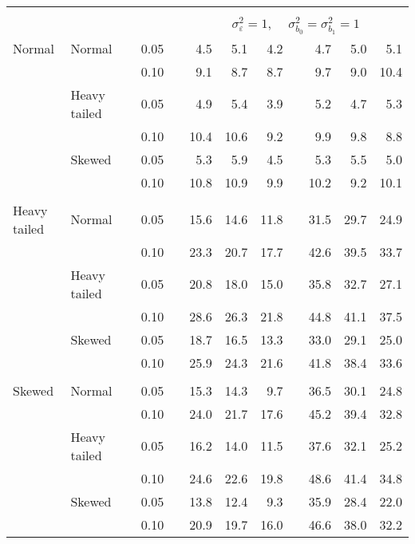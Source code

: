 \begin{table}[ht]
\begin{scriptsize}
\begin{tabular}{ll p{.1cm} c p{.1cm} rrr p{.1cm} rrr}
&&&&&&&&&&&\\
& && && \multicolumn{7}{c}{$\sigma_{\varepsilon}^2 = 1$, \ \ $\sigma_{b_0}^2 = \sigma_{b_1}^2 = 1$} \\ \cline{6-12}
\rowcolor{gray!20} Normal & Normal &  & 0.05 &  & 4.5 & 5.1 & 4.2 &  & 4.7 & 5.0 & 5.1 \\ 
\rowcolor{gray!20}    &  &  & 0.10 &  & 9.1 & 8.7 & 8.7 &  & 9.7 & 9.0 & 10.4 \\ 
\rowcolor{gray!20}    & Heavy tailed &  & 0.05 &  & 4.9 & 5.4 & 3.9 &  & 5.2 & 4.7 & 5.3 \\ 
\rowcolor{gray!20}    &  &  & 0.10 &  & 10.4 & 10.6 & 9.2 &  & 9.9 & 9.8 & 8.8 \\ 
\rowcolor{gray!20}    & Skewed &  & 0.05 &  & 5.3 & 5.9 & 4.5 &  & 5.3 & 5.5 & 5.0 \\ 
\rowcolor{gray!20}    &  &  & 0.10 &  & 10.8 & 10.9 & 9.9 &  & 10.2 & 9.2 & 10.1 \\ 
&&&&&&&&&&&\\
  Heavy tailed & Normal &  & 0.05 &  & 15.6 & 14.6 & 11.8 &  & 31.5 & 29.7 & 24.9 \\ 
   &  &  & 0.10 &  & 23.3 & 20.7 & 17.7 &  & 42.6 & 39.5 & 33.7 \\ 
   & Heavy tailed &  & 0.05 &  & 20.8 & 18.0 & 15.0 &  & 35.8 & 32.7 & 27.1 \\ 
   &  &  & 0.10 &  & 28.6 & 26.3 & 21.8 &  & 44.8 & 41.1 & 37.5 \\ 
   & Skewed &  & 0.05 &  & 18.7 & 16.5 & 13.3 &  & 33.0 & 29.1 & 25.0 \\ 
   &  &  & 0.10 &  & 25.9 & 24.3 & 21.6 &  & 41.8 & 38.4 & 33.6 \\ 
&&&&&&&&&&&\\
  Skewed & Normal &  & 0.05 &  & 15.3 & 14.3 & 9.7 &  & 36.5 & 30.1 & 24.8 \\ 
   &  &  & 0.10 &  & 24.0 & 21.7 & 17.6 &  & 45.2 & 39.4 & 32.8 \\ 
   & Heavy tailed &  & 0.05 &  & 16.2 & 14.0 & 11.5 &  & 37.6 & 32.1 & 25.2 \\ 
   &  &  & 0.10 &  & 24.6 & 22.6 & 19.8 &  & 48.6 & 41.4 & 34.8 \\ 
   & Skewed &  & 0.05 &  & 13.8 & 12.4 & 9.3 &  & 35.9 & 28.4 & 22.0 \\ 
   &  &  & 0.10 &  & 20.9 & 19.7 & 16.0 &  & 46.6 & 38.0 & 32.2 \\ 


\end{tabular}
\end{scriptsize}
\end{table}
